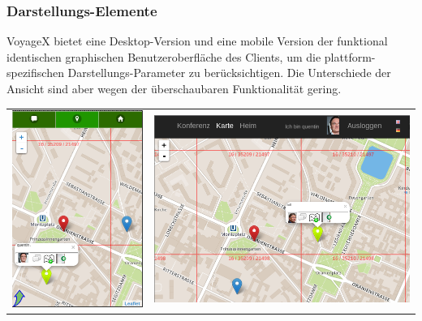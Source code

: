 \enlargethispage{3\baselineskip} %
\subsubsection{Darstellungs-Elemente}
VoyageX bietet eine Desktop-Version und eine mobile Version der funktional identischen graphischen Benutzeroberfläche des Clients, um die plattform-spezifischen Darstellungs-Parameter zu berücksichtigen.
Die Unterschiede  der Ansicht sind aber wegen der überschaubaren Funktionalität gering.

\begin{table}[H]
  \begin{adjustwidth}{-0.7cm}{0.7cm}
  \begin{tabulary}{\columnwidth}{ c c }
	\includegraphics[scale=0.6]{bilder/screenshots/map_mobile.png} & \includegraphics[scale=0.62]{bilder/screenshots/map_desktop.png} \\

\end{tabulary}
\end{adjustwidth}
\end{table}
